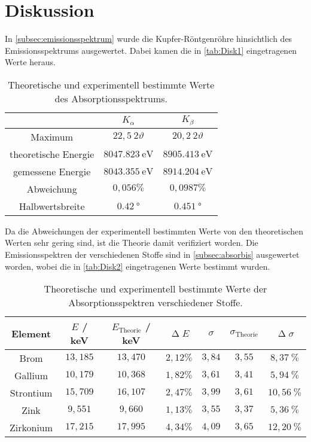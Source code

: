 \section{Diskussion}
\label{sec:Diskussion}
In \autoref{subsec:emissionsspektrum} wurde die Kupfer-Röntgenröhre hinsichtlich des Emissionsspektrums ausgewertet. Dabei kamen die in \autoref{tab:Disk1} eingetragenen Werte heraus.

\begin{table}[H]
    \caption{Theoretische und experimentell bestimmte Werte des Absorptionsspektrums.}
    \label{tab:Disk1}
    \centering
    \begin{tabular}{c c c}
        \toprule
         & $K_\alpha$ & $K_\beta$\\
        \midrule
        Maximum & $22,5 ~ 2\vartheta$ & $20,2 ~ 2\vartheta$ \\
        theoretische Energie & $\SI{8047,823}{\eV}$ & $\SI{8905,413}{\eV}$ \\
        gemessene Energie & $\SI{8043,355}{\eV}$ & $\SI{8914,204}{\eV}$ \\
        Abweichung & $0,056 \%$ & $0,0987 \%$ \\
        Halbwertsbreite & $\SI{0,42}{\degree}$ & $\SI{0,451}{\degree}$ \\
        \bottomrule
    \end{tabular}
\end{table}
Da die Abweichungen der experimentell bestimmten Werte von den theoretischen Werten \cite{NistXray} \cite{Abschirmkonstanten} sehr gering sind, ist die Theorie damit verifiziert worden.\newline
Die Emissionsspektren der verschiedenen Stoffe sind in \autoref{subsec:absorbis} ausgewertet worden, wobei die in \autoref{tab:Disk2} eingetragenen Werte bestimmt wurden.
\begin{table}[H]
    \caption{Theoretische und experimentell bestimmte Werte der Absorptionsspektren verschiedener Stoffe.}
    \centering
    \label{tab:Disk2}
    \begin{tabular}{c| c c c c c c}
        \toprule
        Element  & $E$ / keV & $E_{\text{Theorie}}$ / keV & $\upDelta E$ & $\sigma$ & $\sigma_{\text{Theorie}}$ & $\upDelta \sigma$ \\
        \midrule
        Brom      & $13,185$  & $13,470$  & $2,12 \%$ & $3,84$ & $3,55$ & $8,37   ~\%$ \\
        Gallium   & $10,179$  & $10,368$  & $1,82 \%$ & $3,61$ & $3,41$ & $5,94  ~\%$ \\
        Strontium & $15,709$  & $16,107$  & $2,47 \%$ & $3,99$ & $3,61$ & $10,56 ~\%$ \\
        Zink      & $9,551$   & $9,660$   & $1,13 \%$ & $3,55$ & $3,37$ & $5,36  ~\%$ \\
        Zirkonium & $17,215$  & $17,995$  & $4,34 \%$ & $4,09$ & $3,65$ & $12,20 ~\%$ \\
        \bottomrule
    \end{tabular}
\end{table}
